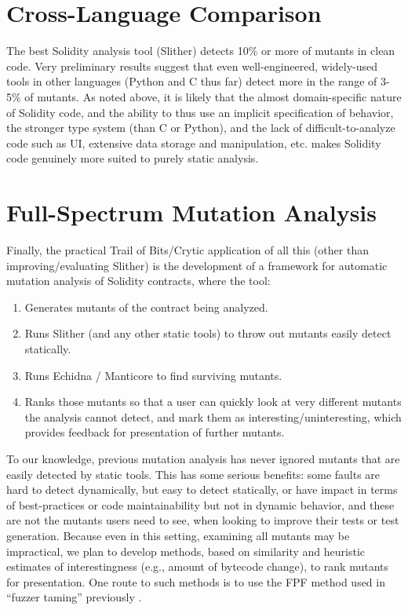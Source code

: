 \documentclass{article}
\begin{document}
\section{Cross-Language Comparison}

The best Solidity analysis tool (Slither) detects 10\% or more of mutants in clean code.   Very preliminary results suggest that even well-engineered, widely-used tools in other languages (Python and C thus far) detect more in the range of 3-5\% of mutants.  As noted above, it is likely that the almost domain-specific nature of Solidity code, and the ability to thus use an implicit specification of behavior, the stronger type system (than C or Python), and the lack of difficult-to-analyze code such as UI, extensive data storage and manipulation, etc. makes Solidity code genuinely more suited to purely static analysis. 

\section{Full-Spectrum Mutation Analysis}

Finally, the practical Trail of Bits/Crytic application of all this (other than improving/evaluating Slither) is the development of a framework for automatic mutation analysis of Solidity contracts, where the tool:

\begin{enumerate}
\item Generates mutants of the contract being analyzed.
\item Runs Slither (and any other static tools) to throw out mutants easily detect statically.
\item Runs Echidna / Manticore to find surviving mutants.
\item Ranks those mutants so that a user can quickly look at very different mutants the analysis cannot detect, and mark them as interesting/uninteresting, which provides feedback for presentation of further mutants.
\end{enumerate}

To our knowledge, previous mutation analysis has never ignored mutants that are easily detected by static tools.  This has some serious benefits:  some faults are hard to detect dynamically, but easy to detect statically, or have impact in terms of best-practices or code maintainability but not in dynamic behavior, and these are not the mutants users need to see, when looking to improve their tests or test generation.  Because even in this setting, examining all mutants may be impractical, we plan to develop methods, based on similarity and heuristic estimates of interestingness (e.g., amount of bytecode change), to rank mutants for presentation.  One route to such methods is to use the FPF \cite{Gonzalez85} method used in ``fuzzer taming'' previously \cite{PLDI13,distMut}.



\end{document}
